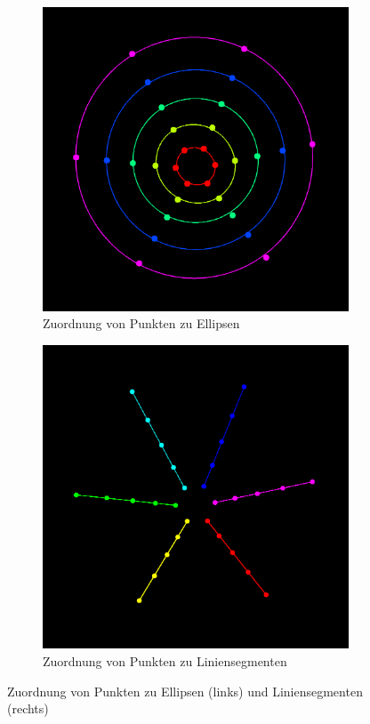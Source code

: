 \begin{figure}[!htb]
	\centering
	\begin{subfigure}{.5\textwidth}
		\centering
		\includegraphics[width=.9\textwidth]{images/ellipseMapping.png}
		\caption{Zuordnung von Punkten zu Ellipsen}
		\label{fig:ellipseMapping}
	\end{subfigure}%
	\begin{subfigure}{.5\textwidth}
		\centering
		\includegraphics[width=.9\textwidth]{images/lineMapping.png}
		\caption{Zuordnung von Punkten zu Liniensegmenten}
		\label{fig:lineMapping}
	\end{subfigure}
	\caption{Zuordnung von Punkten zu Ellipsen (links) und Liniensegmenten (rechts)}
	\label{fig:mapping}
\end{figure}


